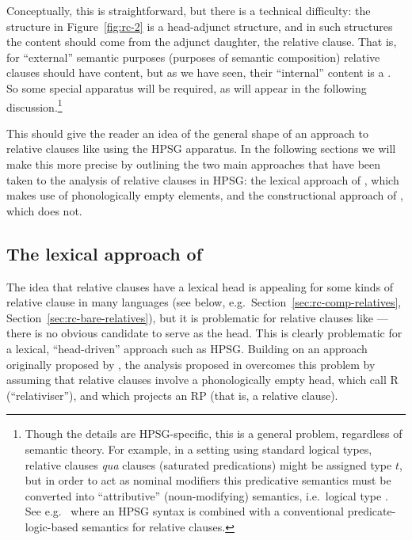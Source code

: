 \documentclass[output=paper
 	        ,biblatex
                ,babelshorthands
                ,newtxmath
                ,draftmode
                ,colorlinks, citecolor=brown
]{langscibook}
\begin{document}
Conceptually, this is straightforward, but there is a technical difficulty: the structure in
Figure~\ref{fig:rc-2} is a head-adjunct structure, and in such structures the content should
come from the adjunct daughter, the relative clause. That is, for ``external'' semantic
purposes (purposes of semantic composition) relative clauses should have
 content, but as we have seen, their ``internal'' content is a
. So some special apparatus will be required, as will appear in the following
discussion.\footnote{Though the details are HPSG-specific, this is a general problem,
  regardless of semantic theory. For example, in a setting using standard logical types,
  relative clauses \emph{qua} clauses (saturated predications) might be assigned type $t$,
  but in order to act as nominal modifiers this predicative semantics must be converted
  into ``attributive'' (noun-modifying) semantics, i.e.\  logical type
  . See e.g.\  where an HPSG syntax is combined with a conventional
  predicate-logic-based semantics for relative clauses. }

This should give the reader an idea of the general shape of an approach to relative
clauses like  using the HPSG apparatus. In the following sections we will make this
more precise by outlining the two main approaches that have been taken to the analysis of
relative clauses in HPSG: the lexical approach of \citet[Chapter~5]{Pollard:Sag:94}, which
makes use of phonologically empty elements, and the constructional approach of
\citet{Sag:97}, which does not.

\subsection{The lexical approach of }
\label{sec:rc-pollard--sag}

The idea that relative clauses have a lexical head is appealing for some kinds of relative
clause in many languages (see below, e.g.\ Section~\ref{sec:rc-comp-relatives},
Section~\ref{sec:rc-bare-relatives}), but it is problematic for relative clauses like
 --- there is no obvious candidate to serve as the head.  This is clearly
problematic for a lexical, ``head-driven'' approach such as HPSG. Building on an approach originally
proposed by \citet{borsley1989phrase}, the analysis proposed in
 overcomes this problem by assuming that relative clauses
involve a phonologically empty head, which \citeauthor{Pollard:Sag:94} call R
(``relativiser''), and which projects an RP (that is, a relative clause).
\end{document}
